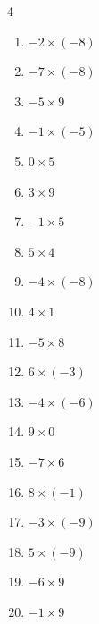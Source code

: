 \begin{multicols}{4}
\begin{enumerate}
  \item $-2\times (-8)$
        \phantom{$=16$}

  \item $-7\times (-8)$
        \phantom{$=56$}

  \item $-5\times 9$
        \phantom{$=-45$}

  \item $-1\times (-5)$
        \phantom{$=5$}

\columnbreak %

  \item $0\times 5$
        \phantom{$=0$}

  \item $3\times 9$
        \phantom{$=27$}

  \item $-1\times 5$
        \phantom{$=-5$}

  \item $5\times 4$
        \phantom{$=20$}

  \item $-4\times (-8)$
        \phantom{$=32$}

  \item $4\times 1$
        \phantom{$=4$}

  \item $-5\times 8$
        \phantom{$=-40$}

  \item $6\times (-3)$
        \phantom{$=-18$}

  \item $-4\times (-6)$
        \phantom{$=24$}

  \item $9\times 0$
        \phantom{$=0$}

  \item $-7\times 6$
        \phantom{$=-42$}

  \item $8\times (-1)$
        \phantom{$=-8$}

  \item $-3\times (-9)$
        \phantom{$=27$}

  \item $5\times (-9)$
        \phantom{$=-45$}

  \item $-6\times 9$
        \phantom{$=-54$}

  \item $-1\times 9$
        \phantom{$=-9$}


\end{enumerate}
\end{multicols}
